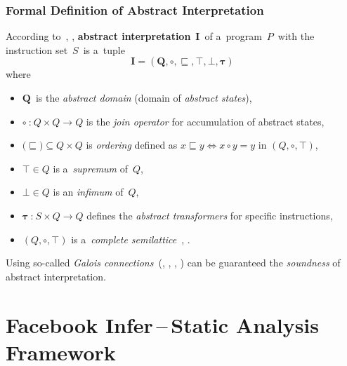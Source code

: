 \subsubsection{Formal Definition of Abstract Interpretation}

\begin{definition}
    According to~\cite{AILatticeModelCousot}, \cite{favAI},
    \textbf{abstract interpretation}~$ \boldsymbol{I} $~of a~program~$ P $~with
    the instruction set~$ S $~is a~tuple
    $$ \boldsymbol{I = (Q, \circ, \sqsubseteq, \top, \bot, \tau)} $$
    where
    \begin{itemize}
        \item
            $ \boldsymbol{Q} $~is the \emph{abstract domain} (domain of
            \emph{abstract states}),

        \item
            $ \boldsymbol{\circ}~\text{:}~Q \times Q \rightarrow Q $
            is the \emph{join operator} for accumulation of abstract states,

        \item
            $ \text{(}\boldsymbol{\sqsubseteq}\text{)} \subseteq Q \times Q $ is
            \emph{ordering} defined as
            $ x \sqsubseteq y \Leftrightarrow x \circ y = y $ in
            $ (Q, \circ, \top) $,

        \item
            $ \boldsymbol{\top} \in Q $ is a~\emph{supremum} of~$ Q $,

        \item
            $ \boldsymbol{\bot} \in Q $ is an \emph{infimum} of~$ Q $,

        \item
            $ \boldsymbol{\tau}~\text{:}~S \times Q \rightarrow Q $
            defines the \emph{abstract transformers} for specific instructions,

        \item
            $ (Q, \circ, \top) $ is a~\emph{complete
            semilattice}~\cite{favLatticesAndFixpoints}, \cite{favAI}.
    \end{itemize}
\end{definition}

Using so-called \emph{Galois connections}~(\cite{programAnalysisNielson},
\cite{wideningNarrowingCousot}, \cite{favAI}, \cite{AICousotWeb}) can be
guaranteed the \emph{soundness} of abstract interpretation.


\section{\texorpdfstring{Facebook Infer\,--\,Static Analysis Framework}{}}
\label{sec:fbinfer}

